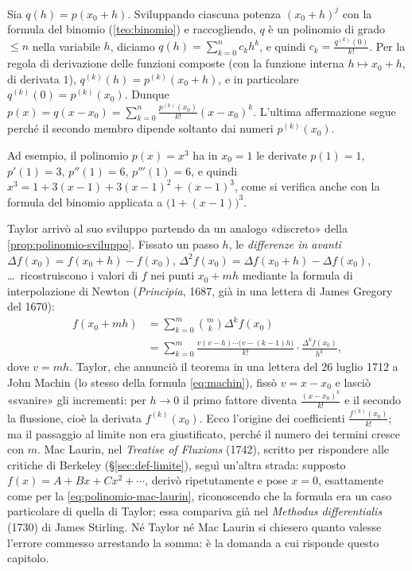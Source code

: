 \begin{dimostrazione}
Sia $q(h)=p(x_{0}+h)$. Sviluppando ciascuna potenza $(x_{0}+h)^{j}$ con la formula del binomio
(\cref{teo:binomio}) e raccogliendo, $q$ è un polinomio di grado $\le n$ nella variabile
$h$, diciamo $q(h)=\sum_{k=0}^{n}c_{k}h^{k}$, e quindi $c_{k}=\frac{q^{(k)}(0)}{k!}$. Per la regola di
derivazione delle funzioni composte (con la funzione interna $h\mapsto x_{0}+h$, di derivata
$1$), $q^{(k)}(h)=p^{(k)}(x_{0}+h)$, e in particolare $q^{(k)}(0)=p^{(k)}(x_{0})$. Dunque
$p(x)=q(x-x_{0})=\sum_{k=0}^{n}\frac{p^{(k)}(x_{0})}{k!}(x-x_{0})^{k}$. L'ultima affermazione segue
perché il secondo membro dipende soltanto dai numeri $p^{(k)}(x_{0})$.
\end{dimostrazione}

Ad esempio, il polinomio $p(x)=x^{3}$ ha in $x_{0}=1$ le derivate $p(1)=1$, $p'(1)=3$,
$p''(1)=6$, $p'''(1)=6$, e quindi $x^{3}=1+3(x-1)+3(x-1)^{2}+(x-1)^{3}$, come si verifica
anche con la formula del binomio applicata a $\bigl(1+(x-1)\bigr)^{3}$.

\begin{notastorica}
Taylor arrivò al suo sviluppo partendo da un analogo «discreto» della
\cref{prop:polinomio-sviluppo}. Fissato un passo $h$, le \emph{differenze in avanti}
$\Delta f(x_{0})=f(x_{0}+h)-f(x_{0})$, $\Delta^{2}f(x_{0})=\Delta f(x_{0}+h)-\Delta f(x_{0})$, \dots\
ricostruiscono i valori di $f$ nei punti $x_{0}+mh$ mediante la formula di interpolazione
di Newton (\emph{Principia}, 1687, già in una lettera di James Gregory del 1670):
\[
\begin{aligned}
  f(x_{0}+mh)&=\sum_{k=0}^{m}\binom mk\Delta^{k}f(x_{0})\\
  &=\sum_{k=0}^{m}\frac{v(v-h)\cdots\bigl(v-(k-1)h\bigr)}{k!}\cdot\frac{\Delta^{k}f(x_{0})}{h^{k}} ,
\end{aligned}
\]
dove $v=mh$. Taylor, che annunciò il teorema in una lettera del 26 luglio 1712 a John
Machin (lo stesso della formula \eqref{eq:machin}), fissò $v=x-x_{0}$ e lasciò «svanire»
gli incrementi: per $h\to0$ il primo fattore diventa $\frac{(x-x_{0})^{k}}{k!}$ e il secondo la
flussione, cioè la derivata $f^{(k)}(x_{0})$. Ecco l'origine dei coefficienti
$\frac{f^{(k)}(x_{0})}{k!}$; ma il passaggio al limite non era giustificato, perché il numero
dei termini cresce con $m$. Mac Laurin, nel \emph{Treatise of Fluxions} (1742), scritto per
rispondere alle critiche di Berkeley (\S\ref{sec:def-limite}), seguì un'altra strada:
supposto $f(x)=A+Bx+Cx^{2}+\cdots$, derivò ripetutamente e pose $x=0$, esattamente come
per la \eqref{eq:polinomio-mac-laurin}, riconoscendo che la formula era un caso
particolare di quella di Taylor; essa compariva già nel \emph{Methodus differentialis}
(1730) di James Stirling. Né Taylor né Mac Laurin si chiesero quanto valesse l'errore
commesso arrestando la somma: è la domanda a cui risponde questo capitolo.
\end{notastorica}

